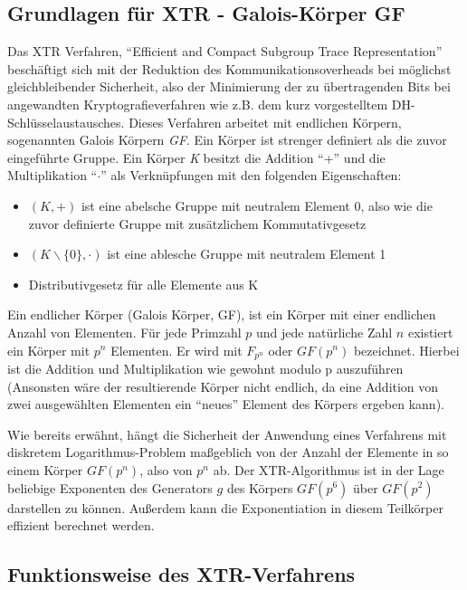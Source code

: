 \documentclass[10pt,        %
               a4paper,     %
               journal,     %
               ]{IEEEtran}
\begin{document}
\subsection{Grundlagen für XTR - Galois-Körper GF}
Das XTR Verfahren, "`Efficient and Compact Subgroup Trace Representation"' beschäftigt sich mit der Reduktion des Kommunikationsoverheads bei möglichst gleichbleibender Sicherheit, also der Minimierung der zu übertragenden Bits bei angewandten Kryptografieverfahren wie z.B. dem kurz vorgestelltem DH-Schlüsselaustausches.
Dieses Verfahren arbeitet mit endlichen Körpern, sogenannten Galois Körpern \emph{GF}. Ein Körper ist strenger definiert als die zuvor eingeführte Gruppe. Ein Körper \emph{K} besitzt die Addition "`+"' und die Multiplikation "`$\cdot$"' als Verknüpfungen mit den folgenden Eigenschaften:

\begin{itemize}
	\item $(K,+)$ ist eine abelsche Gruppe mit neutralem Element 0, also wie die zuvor definierte Gruppe mit zusätzlichem Kommutativgesetz
	\item $(K \backslash \{0\},\cdot)$ ist eine ablesche Gruppe mit neutralem Element 1
	\item Distributivgesetz für alle Elemente aus K
\end{itemize}

Ein endlicher Körper (Galois Körper, GF), ist ein Körper mit einer endlichen Anzahl von Elementen.
Für jede Primzahl $p$ und jede natürliche Zahl $n$ existiert ein Körper mit $p^n$ Elementen. Er wird mit $F_{p^n}$ oder $GF(p^n)$ bezeichnet. Hierbei ist die Addition und Multiplikation wie gewohnt  modulo p auszuführen (Ansonsten wäre der resultierende Körper nicht endlich, da eine Addition von zwei ausgewählten Elementen ein "`neues"' Element des Körpers ergeben kann).

Wie bereits erwähnt, hängt die Sicherheit der Anwendung eines Verfahrens mit diskretem Logarithmus-Problem maßgeblich von der Anzahl der Elemente in so einem Körper $GF(p^n)$, also von $p^n$ ab. Der XTR-Algorithmus ist in der Lage beliebige Exponenten des Generators $g$ des Körpers $GF(p^6)$ über $GF(p^2)$ darstellen zu können. Außerdem kann die Exponentiation in diesem Teilkörper effizient berechnet werden.

\subsection{Funktionsweise des XTR-Verfahrens}
\end{document}
